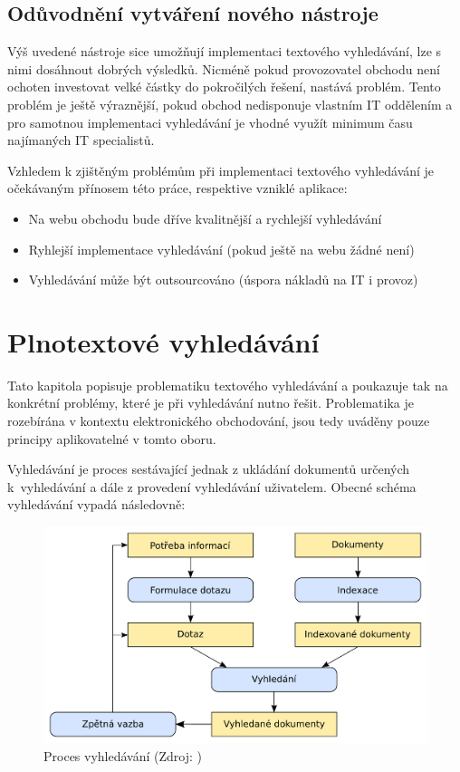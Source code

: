 \documentclass[FM,DP]{tulthesis}
\begin{document}
\section{Odůvodnění vytváření nového nástroje}

Výš uvedené nástroje sice umožňují implementaci textového vyhledávání, lze s nimi
dosáhnout dobrých výsledků. Nicméně pokud provozovatel obchodu není ochoten investovat
velké částky do pokročilých řešení, nastává problém. Tento problém je ještě výraznější, 
pokud obchod nedisponuje vlastním IT oddělením a pro samotnou implementaci vyhledávání
je vhodné využít minimum času najímaných IT specialistů.

Vzhledem k zjištěným problémům při implementaci textového vyhledávání je očekávaným
přínosem této práce, respektive vzniklé aplikace:

\begin{itemize}
\item Na webu obchodu bude dříve kvalitnější a rychlejší vyhledávání
\item Ryhlejší implementace vyhledávání (pokud ještě na webu žádné není)
\item Vyhledávání může být outsourcováno (úspora nákladů na IT i provoz)
\end{itemize}


\chapter{Plnotextové vyhledávání}

Tato kapitola popisuje problematiku textového vyhledávání a poukazuje tak na konkrétní
problémy, které je při vyhledávání nutno řešit. Problematika je rozebírána v kontextu
elektronického obchodování, jsou tedy uváděny pouze principy aplikovatelné v tomto
oboru.

Vyhledávání je proces sestávající jednak z ukládání dokumentů určených k~vyhledávání
a dále z provedení vyhledávání uživatelem. Obecné schéma vyhledávání vypadá následovně:

\begin{figure}[h]
\center
\includegraphics[width=\textwidth]{schema-vyhledavani.pdf}
\caption[Proces vyhledávání]{Proces vyhledávání (Zdroj: \cite{searching})}
\label{schema-vyhledavani}
\end{figure}
\end{document}
